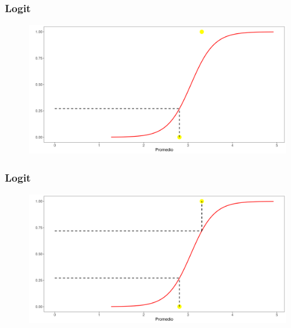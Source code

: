 \documentclass[
  shownotes,
  xcolor={svgnames},
  hyperref={colorlinks,citecolor=DarkBlue,linkcolor=andesred,urlcolor=DarkBlue}
  , aspectratio=169]{beamer}
\begin{document}
\begin{frame}[fragile]
\frametitle{Logit}



        \begin{figure}[H] \centering
            \captionsetup{justification=centering}
              \includegraphics[scale=0.45]{figures/fig5}
              
 \end{figure}


\end{frame}
\begin{frame}[fragile]
\frametitle{Logit}



        \begin{figure}[H] \centering
            \captionsetup{justification=centering}
              \includegraphics[scale=0.45]{figures/fig6}
              
 \end{figure}


\end{frame}
\end{document}
